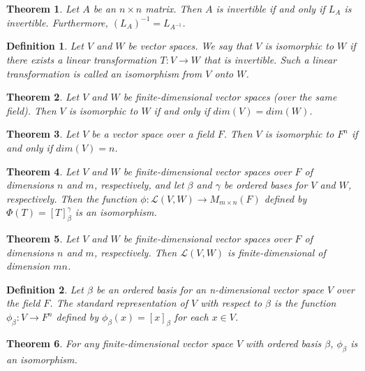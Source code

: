 \documentclass[a4paper]{article}
\newtheorem{mytheorem}{Theorem}
\newtheorem{mydef}{Definition}
\numberwithin{mytheorem}{section}
\numberwithin{mydef}{section}
\numberwithin{example}{section}
\begin{document}
\begin{mytheorem} Let $A$ be an $n \times n$ matrix. Then $A$ is invertible if and only if $L_{A}$ is invertible. Furthermore, $(L_{A})^{-1} = L_{A^{-1}}$. 
\end{mytheorem}

\begin{mydef} Let $V$ and $W$ be vector spaces. We say that $V$ is isomorphic to $W$ if there exists a linear transformation $T: V \rightarrow W$ that is invertible. Such a linear transformation is called an isomorphism from $V$ onto $W$.
\end{mydef}

\begin{mytheorem} Let $V$ and $W$ be finite-dimensional vector spaces (over the same field). Then $V$ is isomorphic to $W$ if and only if $dim(V) = dim(W)$.
\end{mytheorem}

\begin{mytheorem} Let $V$ be a vector space over a field $F$. Then $V$ is isomorphic to $F^{n}$ if and only if $dim(V) = n$.
\end{mytheorem}

\begin{mytheorem} Let $V$ and $W$ be finite-dimensional vector spaces over $F$ of dimensions $n$ and $m$, respectively, and let $\beta$ and $\gamma$ be ordered bases for $V$ and $W$, respectively. Then the function $\phi: \mathcal{L}(V,W) \rightarrow M_{m \times n}(F)$ defined by $\Phi(T) = [T]^{\gamma}_{\beta}$ is an isomorphism.
\end{mytheorem}

\begin{mytheorem} Let $V$ and $W$ be finite-dimensional vector spaces over $F$ of dimensions $n$ and $m$, respectively. Then $\mathcal{L}(V,W)$ is finite-dimensional of dimension $mn$.
\end{mytheorem}

\begin{mydef} Let $\beta$ be an ordered basis for an n-dimensional vector space $V$ over the field $F$. The standard representation of $V$ with respect to $\beta$ is the function $\phi_{\beta}: V \rightarrow F^{n}$ defined by $\phi_{\beta}(x) = [x]_{\beta}$ for each $x \in V$. 
\end{mydef}

\begin{mytheorem} For any finite-dimensional vector space $V$ with ordered basis $\beta$, $\phi_{\beta}$ is an isomorphism.
\end{mytheorem}
\end{document}
